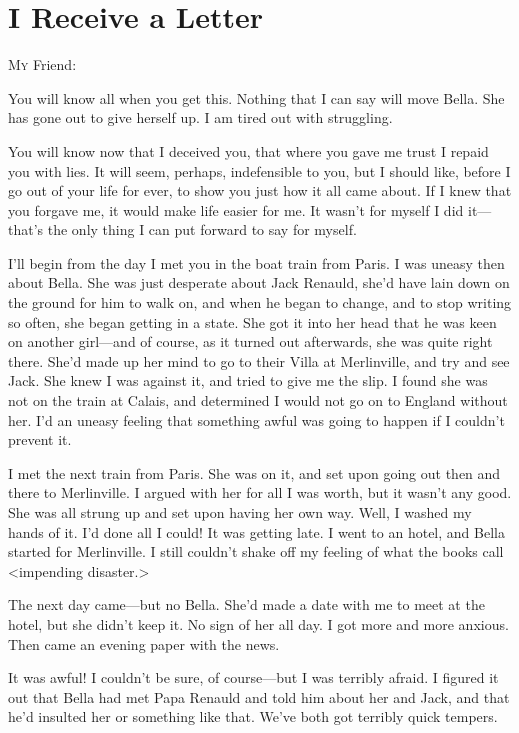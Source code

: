 \chapter{I Receive a Letter}

\begin{mail}{}{\lettrine{M}{y} Friend:}
	
\vspace{3em}
You will know all when you get this. Nothing that I can say will move Bella. She has gone out to give herself up. I am tired out with struggling.

You will know now that I deceived you, that where you gave me trust I repaid you with lies. It will seem, perhaps, indefensible to you, but I should like, before I go out of your life for ever, to show you just how it all came about. If I knew that you forgave me, it would make life easier for me. It wasn't for myself I did it—that's the only thing I can put forward to say for myself.

I'll begin from the day I met you in the boat train from Paris. I was uneasy then about Bella. She was just desperate about Jack Renauld, she'd have lain down on the ground for him to walk on, and when he began to change, and to stop writing so often, she began getting in a state. She got it into her head that he was keen on another girl—and of course, as it turned out afterwards, she was quite right there. She'd made up her mind to go to their Villa at Merlinville, and try and see Jack. She knew I was against it, and tried to give me the slip. I found she was not on the train at Calais, and determined I would not go on to England without her. I'd an uneasy feeling that something awful was going to happen if I couldn't prevent it.

I met the next train from Paris. She was on it, and set upon going out then and there to Merlinville. I argued with her for all I was worth, but it wasn't any good. She was all strung up and set upon having her own way. Well, I washed my hands of it. I'd done all I could! It was getting late. I went to an hotel, and Bella started for Merlinville. I still couldn't shake off my feeling of what the books call <impending disaster.>

The next day came—but no Bella. She'd made a date with me to meet at the hotel, but she didn't keep it. No sign of her all day. I got more and more anxious. Then came an evening paper with the news.

It was awful! I couldn't be sure, of course—but I was terribly afraid. I figured it out that Bella had met Papa Renauld and told him about her and Jack, and that he'd insulted her or something like that. We've both got terribly quick tempers.


\end{mail}
